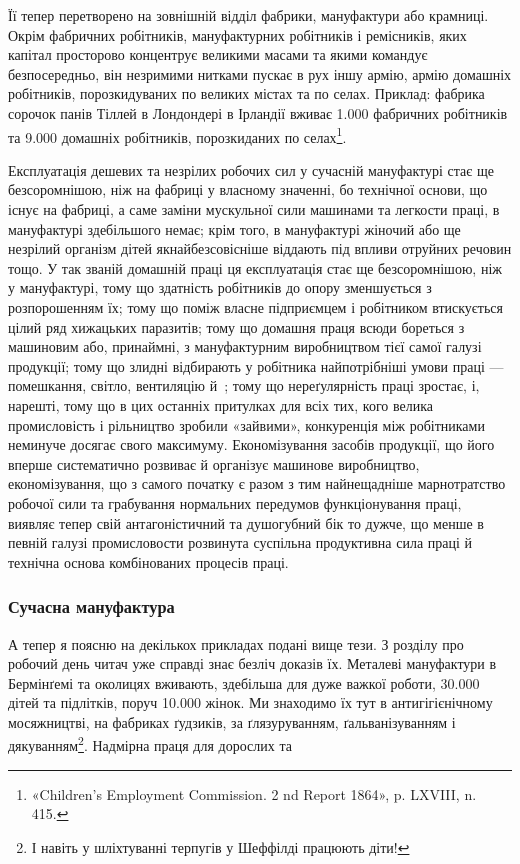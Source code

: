 \parcont{}  %
Її тепер перетворено на зовнішній відділ фабрики, мануфактури
або крамниці. Окрім фабричних робітників, мануфактурних робітників
і ремісників, яких капітал просторово концентрує великими
масами та якими командує безпосередньо, він незримими
нитками пускає в рух іншу армію, армію домашніх робітників,
порозкидуваних по великих містах та по селах. Приклад: фабрика
сорочок панів Тіллей в Лондондері в Ірландії вживає \num{1.000} фабричних
робітників та \num{9.000} домашніх робітників, порозкиданих по
селах\footnote{
«Children’s Employment Commission. 2 nd Report 1864»,
p. LXVIII, n. 415.
}.

Експлуатація дешевих та незрілих робочих сил у сучасній
мануфактурі стає ще безсоромнішою, ніж на фабриці у власному
значенні, бо технічної основи, що існує на фабриці, а саме заміни
мускульної сили машинами та легкости праці, в мануфактурі
здебільшого немає; крім того, в мануфактурі жіночий або ще
незрілий організм дітей якнайбезсовісніше віддають під впливи
отруйних речовин тощо. У так званій домашній праці ця експлуатація
стає ще безсоромнішою, ніж у мануфактурі, тому що здатність
робітників до опору зменшується з розпорошенням їх;
тому що поміж власне підприємцем і робітником втискується цілий
ряд хижацьких паразитів; тому що домашня праця всюди бореться
з машиновим або, принаймні, з мануфактурним виробництвом тієї
самої галузі продукції; тому що злидні відбирають у робітника
найпотрібніші умови праці — помешкання, світло, вентиляцію
й~; тому що нереґулярність праці зростає, і, нарешті, тому
що в цих останніх притулках для всіх тих, кого велика промисловість
і рільництво зробили «зайвими», конкуренція між робітниками
неминуче досягає свого максимуму. Економізування
засобів продукції, що його вперше систематично розвиває й
організує машинове виробництво, економізування, що з самого
початку є разом з тим найнещадніше марнотратство робочої
сили та грабування нормальних передумов функціонування праці,
виявляє тепер свій антагоністичний та душогубний бік то дужче,
що менше в певній галузі промисловости розвинута суспільна
продуктивна сила праці й технічна основа комбінованих процесів
праці.

\manualpagebreak{}
\subsubsection{Сучасна мануфактура}

А тепер я поясню на декількох прикладах подані вище тези.
З розділу про робочий день читач уже справді знає безліч доказів
їх. Металеві мануфактури в Бермінґемі та околицях вживають,
здебільша для дуже важкої роботи, \num{30.000} дітей та підлітків,
поруч \num{10.000} жінок. Ми знаходимо їх тут в антигігієнічному
мосяжництві, на фабриках ґудзиків, за ґлязуруванням, ґальванізуванням
і дякуванням\footnote{
І навіть у шліхтуванні терпугів у Шеффілді працюють діти!
}. Надмірна праця для дорослих та
\parbreak{}  %
